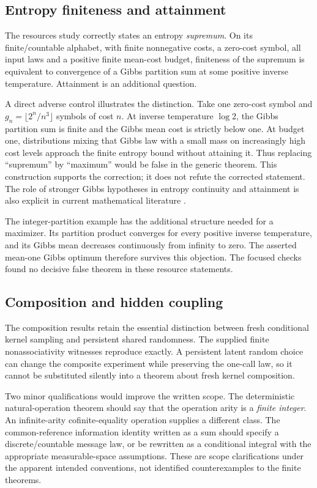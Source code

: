 \documentclass[11pt,a4paper]{article}
\begin{document}
\subsection{Entropy finiteness and attainment}
The resources study correctly states an entropy \emph{supremum}. On its finite/countable alphabet, with finite nonnegative costs, a zero-cost symbol, all input laws and a positive finite mean-cost budget, finiteness of the supremum is equivalent to convergence of a Gibbs partition sum at some positive inverse temperature. Attainment is an additional question.

A direct adverse control illustrates the distinction. Take one zero-cost symbol and $g_n=\lfloor2^n/n^3\rfloor$ symbols of cost $n$. At inverse temperature $\log2$, the Gibbs partition sum is finite and the Gibbs mean cost is strictly below one. At budget one, distributions mixing that Gibbs law with a small mass on increasingly high cost levels approach the finite entropy bound without attaining it. Thus replacing “supremum” by “maximum” would be false in the generic theorem. This construction supports the correction; it does not refute the corrected statement. The role of stronger Gibbs hypotheses in entropy continuity and attainment is also explicit in current mathematical literature \cite{becker}.

The integer-partition example has the additional structure needed for a maximizer. Its partition product converges for every positive inverse temperature, and its Gibbs mean decreases continuously from infinity to zero. The asserted mean-one Gibbs optimum therefore survives this objection. The focused checks found no decisive false theorem in these resource statements.

\subsection{Composition and hidden coupling}
The composition results retain the essential distinction between fresh conditional kernel sampling and persistent shared randomness. The supplied finite nonassociativity witnesses reproduce exactly. A persistent latent random choice can change the composite experiment while preserving the one-call law, so it cannot be substituted silently into a theorem about fresh kernel composition.

Two minor qualifications would improve the written scope. The deterministic natural-operation theorem should say that the operation arity is a \emph{finite integer}. An infinite-arity cofinite-equality operation supplies a different class. The common-reference information identity written as a sum should specify a discrete/countable message law, or be rewritten as a conditional integral with the appropriate measurable-space assumptions. These are scope clarifications under the apparent intended conventions, not identified counterexamples to the finite theorems.
\end{document}
